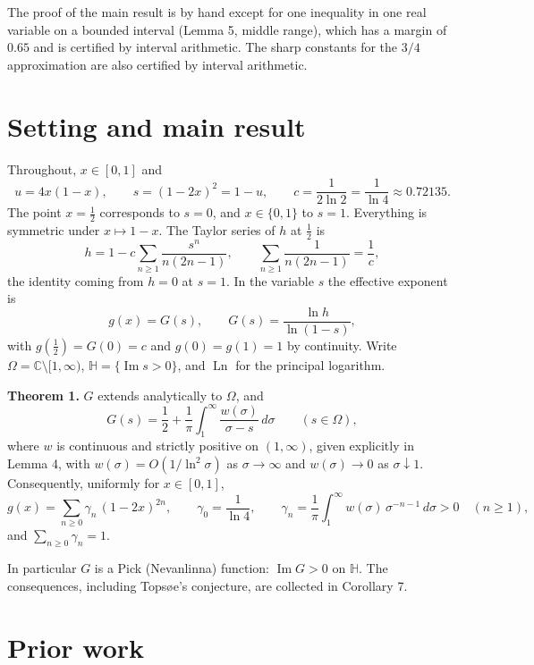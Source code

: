 \documentclass[
  11pt,
]{article}
\begin{document}
The proof of the main result is by hand except for one inequality in one
real variable on a bounded interval (Lemma 5, middle range), which has a
margin of \(0.65\) and is certified by interval arithmetic. The sharp
constants for the \(3/4\) approximation are also certified by interval
arithmetic.

\hypertarget{setting-and-main-result}{%
\section{Setting and main result}\label{setting-and-main-result}}

Throughout, \(x \in [0,1]\) and \[
u = 4x(1-x), \qquad s = (1-2x)^2 = 1-u, \qquad c = \frac{1}{2\ln 2} = \frac{1}{\ln 4} \approx 0.72135 .
\] The point \(x = \tfrac12\) corresponds to \(s = 0\), and
\(x \in \{0,1\}\) to \(s = 1\). Everything is symmetric under
\(x \mapsto 1-x\). The Taylor series of \(h\) at \(\tfrac12\) is \[
h = 1 - c \sum_{n\ge1} \frac{s^n}{n(2n-1)}, \qquad \sum_{n\ge1}\frac{1}{n(2n-1)} = \frac1c , \tag{1}
\] the identity coming from \(h = 0\) at \(s = 1\). In the variable
\(s\) the effective exponent is \[
g(x) = G(s), \qquad G(s) = \frac{\ln h}{\ln(1-s)},
\] with \(g(\tfrac12) = G(0) = c\) and \(g(0) = g(1) = 1\) by
continuity. Write \(\Omega = \mathbb{C} \setminus [1,\infty)\),
\(\mathbb{H} = \{\operatorname{Im} s > 0\}\), and \(\operatorname{Ln}\)
for the principal logarithm.

\textbf{Theorem 1.} \(G\) extends analytically to \(\Omega\), and \[
G(s) = \frac12 + \frac1\pi \int_1^\infty \frac{w(\sigma)}{\sigma - s}\, d\sigma \qquad (s \in \Omega),
\] where \(w\) is continuous and strictly positive on \((1,\infty)\),
given explicitly in Lemma 4, with \(w(\sigma) = O(1/\ln^2\sigma)\) as
\(\sigma \to \infty\) and \(w(\sigma) \to 0\) as
\(\sigma \downarrow 1\). Consequently, uniformly for \(x \in [0,1]\), \[
g(x) = \sum_{n \ge 0} \gamma_n\, (1-2x)^{2n}, \qquad \gamma_0 = \frac{1}{\ln 4}, \qquad \gamma_n = \frac1\pi \int_1^\infty w(\sigma)\, \sigma^{-n-1}\, d\sigma > 0 \quad (n \ge 1),
\] and \(\sum_{n\ge0} \gamma_n = 1\).

In particular \(G\) is a Pick (Nevanlinna) function:
\(\operatorname{Im} G > 0\) on \(\mathbb{H}\). The consequences,
including Topsøe's conjecture, are collected in Corollary 7.

\hypertarget{prior-work}{%
\section{Prior work}\label{prior-work}}
\end{document}
